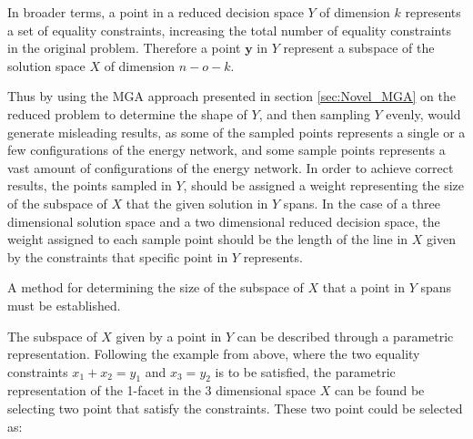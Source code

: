 In broader terms, a point in a reduced decision space $Y$ of dimension $k$ represents a set of equality constraints, increasing the total number of equality constraints in the original problem. Therefore a point $\mathbf{y}$ in $Y$ represent a subspace of the solution space $X$ of dimension $n-o-k$. 






Thus by using the MGA approach presented in section \ref{sec:Novel_MGA} on the reduced problem to determine the shape of $Y$, and then sampling $Y$ evenly, would generate misleading results, as some of the sampled points represents a single or a few configurations of the energy network, and some sample points represents a vast amount of configurations of the energy network. In order to achieve correct results, the points sampled in $Y$, should be assigned a weight representing the size of the subspace of $X$ that the given solution in $Y$ spans. In the case of a three dimensional solution space and a two dimensional reduced decision space, the weight assigned to each sample point should be the length of the line in $X$ given by the constraints that specific point in $Y$ represents. 

A method for determining the size of the subspace of $X$ that a point in $Y$ spans must be established. 

The subspace of $X$ given by a point in $Y$ can be described through a parametric representation. Following the example from above, where the two equality constraints  $ x_1 + x_2 = y_1$ and $x_3 = y_2 $ is to be satisfied, the parametric representation of the 1-facet in the 3 dimensional space $X$ can be found be selecting two point that satisfy the constraints. These two point could be selected as: 


